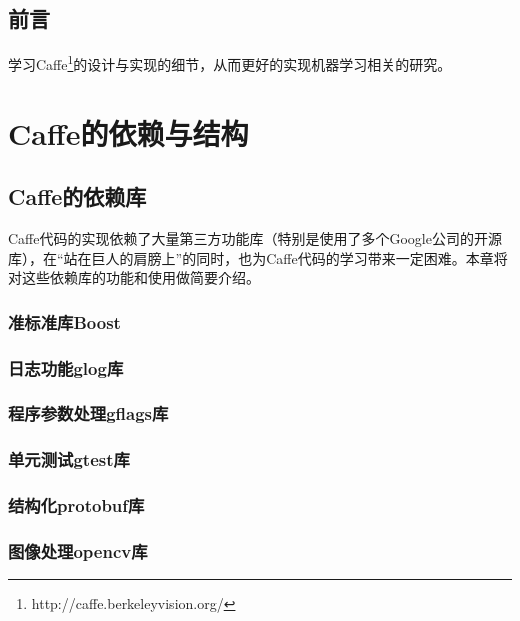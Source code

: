 \documentclass{NanCNBook}
\title{\hei\chuhao{Caffe\cite{jia2014caffe}解析}}
\author{nannanmath}
\begin{document}
\maketitle{}
\thispagestyle{empty}

\frontmatter
\pagestyle{plain}
\chapter*{前{\quad}言}
学习Caffe\footnote{http://caffe.berkeleyvision.org/}的设计与实现的细节，从而更好的实现机器学习相关的研究。



\tableofcontents
\listoffigures
\listoftables


\mainmatter
\pagestyle{fancy}

\part{Caffe的依赖与结构}

\chapter{Caffe的依赖库}
Caffe代码的实现依赖了大量第三方功能库（特别是使用了多个Google公司的开源库），在“站在巨人的肩膀上”的同时，也为Caffe代码的学习带来一定困难。本章将对这些依赖库的功能和使用做简要介绍。
\section{准标准库Boost}

\section{日志功能glog库}

\section{程序参数处理gflags库}

\section{单元测试gtest库}

\section{结构化protobuf库}

\section{图像处理opencv库}
\end{document}
